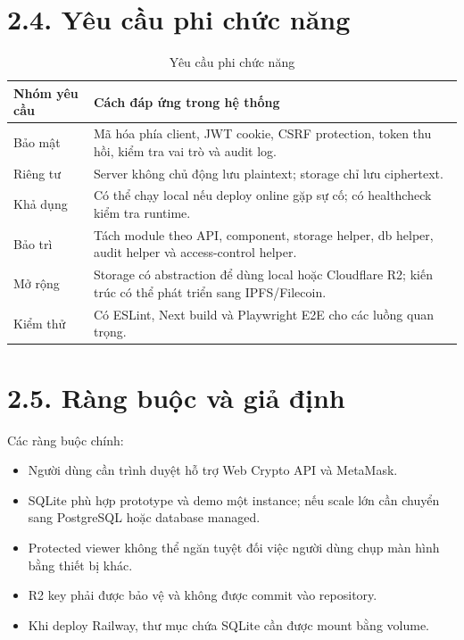 \section*{2.4. Yêu cầu phi chức năng}
{}

\begin{table}[H]
\centering
\caption{Yêu cầu phi chức năng}
\begin{tabularx}{\textwidth}{|p{3.5cm}|X|}
\hline
\textbf{Nhóm yêu cầu} & \textbf{Cách đáp ứng trong hệ thống} \\ \hline
Bảo mật & Mã hóa phía client, JWT cookie, CSRF protection, token thu hồi, kiểm tra vai trò và audit log. \\ \hline
Riêng tư & Server không chủ động lưu plaintext; storage chỉ lưu ciphertext. \\ \hline
Khả dụng & Có thể chạy local nếu deploy online gặp sự cố; có healthcheck kiểm tra runtime. \\ \hline
Bảo trì & Tách module theo API, component, storage helper, db helper, audit helper và access-control helper. \\ \hline
Mở rộng & Storage có abstraction để dùng local hoặc Cloudflare R2; kiến trúc có thể phát triển sang IPFS/Filecoin. \\ \hline
Kiểm thử & Có ESLint, Next build và Playwright E2E cho các luồng quan trọng. \\ \hline
\end{tabularx}
\end{table}

\section*{2.5. Ràng buộc và giả định}
{}

Các ràng buộc chính:

\begin{itemize}
  \item Người dùng cần trình duyệt hỗ trợ Web Crypto API và MetaMask.
  \item SQLite phù hợp prototype và demo một instance; nếu scale lớn cần chuyển sang PostgreSQL hoặc database managed.
  \item Protected viewer không thể ngăn tuyệt đối việc người dùng chụp màn hình bằng thiết bị khác.
  \item R2 key phải được bảo vệ và không được commit vào repository.
  \item Khi deploy Railway, thư mục chứa SQLite cần được mount bằng volume.
\end{itemize}

\clearpage
